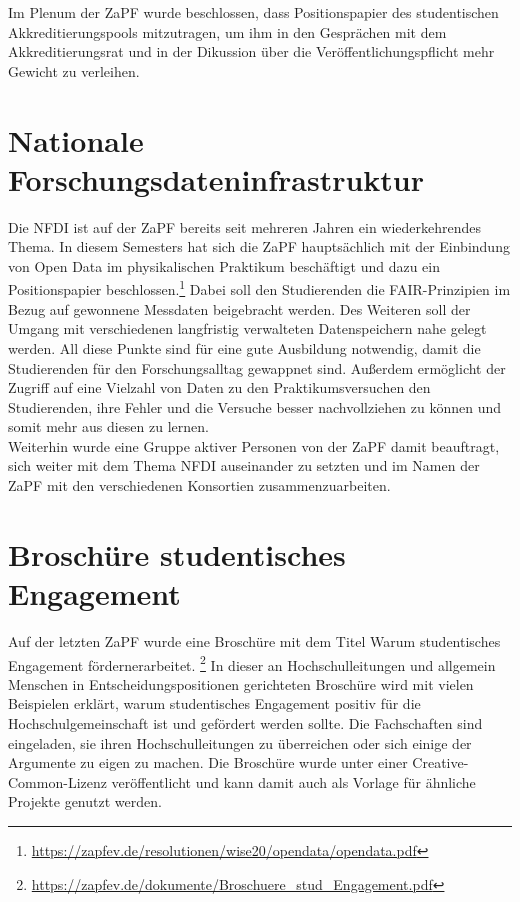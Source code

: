 Im Plenum der ZaPF wurde beschlossen, dass Positionspapier des studentischen Akkreditierungspools mitzutragen, um ihm in den Gesprächen mit dem Akkreditierungsrat und in der Dikussion über die Veröffentlichungspflicht mehr Gewicht zu verleihen.

\section*{Nationale Forschungsdateninfrastruktur}

Die NFDI ist auf der ZaPF bereits seit mehreren Jahren ein wiederkehrendes Thema. In diesem Semesters hat sich die ZaPF hauptsächlich mit der Einbindung von Open Data im physikalischen Praktikum beschäftigt und dazu ein Positionspapier beschlossen.\footnote{\url{https://zapfev.de/resolutionen/wise20/opendata/opendata.pdf}} Dabei soll den Studierenden die FAIR-Prinzipien im Bezug auf gewonnene Messdaten beigebracht werden. Des Weiteren soll der Umgang mit verschiedenen langfristig verwalteten Datenspeichern nahe gelegt werden. All diese Punkte sind für eine gute Ausbildung notwendig, damit die Studierenden für den Forschungsalltag gewappnet sind. Außerdem ermöglicht der Zugriff auf eine Vielzahl von Daten zu den Praktikumsversuchen den Studierenden, ihre Fehler und die Versuche besser nachvollziehen zu können und somit mehr aus diesen zu lernen.\\
Weiterhin wurde eine Gruppe aktiver Personen von der ZaPF damit beauftragt, sich weiter mit dem Thema NFDI auseinander zu setzten und im Namen der ZaPF mit den verschiedenen Konsortien zusammenzuarbeiten. 

\section*{Broschüre studentisches Engagement}

Auf der letzten ZaPF wurde eine Broschüre mit dem Titel \glqq Warum studentisches Engagement fördern\grqq\space erarbeitet. \footnote{\url{https://zapfev.de/dokumente/Broschuere_stud_Engagement.pdf}} In dieser an Hochschulleitungen und allgemein Menschen in Entscheidungspositionen gerichteten Broschüre wird mit vielen Beispielen erklärt, warum studentisches Engagement positiv für die Hochschulgemeinschaft ist und gefördert werden sollte. Die Fachschaften sind eingeladen, sie ihren Hochschulleitungen zu überreichen oder sich einige der Argumente zu eigen zu machen. Die Broschüre wurde unter einer Creative-Common-Lizenz veröffentlicht und kann damit auch als Vorlage für ähnliche Projekte genutzt werden.

